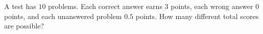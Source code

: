 A test has $10$ problems. Each correct answer earns $3$ points, each wrong answer $0$ points, and each unanswered problem $0.5$ points. How many different total scores are possible?
